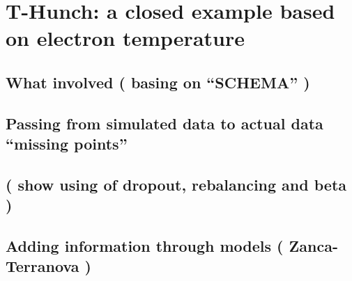 \chapter{T-Hunch: a closed example based on electron temperature}
\section{What involved ( basing on “SCHEMA” )} %
\section{Passing from simulated data to actual data  “missing points”  }
\section{( show using of dropout, rebalancing and beta )}
\section{Adding information through models ( Zanca-Terranova )}
